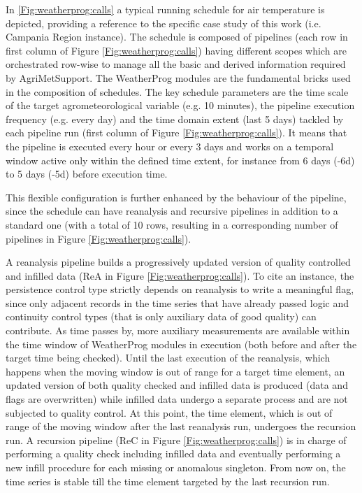 \documentclass[authoryear,preprint,review,12pt]{elsarticle}
\begin{document}
In \cref{Fig:weatherprog:calls} a typical running schedule for air temperature is depicted, providing a reference to the specific case study of this work (i.e. Campania Region instance).
The schedule is composed of pipelines (each row in first column of Figure \ref{Fig:weatherprog:calls}) having different scopes which are orchestrated row-wise to manage all the basic and derived information required by Agri\-Met\-Support.
The WeatherProg modules are the fundamental bricks used in the composition of schedules.
The key schedule parameters are the time scale of the target agrometeorological variable (e.g. 10 minutes), the pipeline execution frequency (e.g. every day) and the time domain extent (last 5 days) tackled by each pipeline run (first column of Figure \ref{Fig:weatherprog:calls}).
It means that the pipeline is executed every hour or every 3 days and works on a temporal window active only within the defined time extent, for instance from 6 days (-6d) to 5 days (-5d) before execution time.

This flexible configuration is further enhanced by the behaviour of the pipeline, since the schedule can have reanalysis and recursive pipelines in addition to a standard one (with a total of 10 rows, resulting in a corresponding number of pipelines in Figure \ref{Fig:weatherprog:calls}).

A reanalysis pipeline builds a progressively updated version of quality controlled and infilled data (ReA in Figure \ref{Fig:weatherprog:calls}).
To cite an instance, the persistence control type strictly depends on reanalysis to write a meaningful flag, since only adjacent records in the time series that have already passed logic and continuity control types (that is only auxiliary data of good quality) can contribute. %
As time passes by, more auxiliary measurements are available within the time window of WeatherProg modules in execution (both before and after the target time being checked). 
Until the last execution of the reanalysis, which happens when the moving window is out of range for a target time element, an updated version of both quality checked and infilled data is produced (data and flags are overwritten) while infilled data undergo a separate process and are not subjected to quality control.
At this point, the time element, which is out of range of the moving window after the last reanalysis run, undergoes the recursion run.
A recursion pipeline (ReC in Figure \ref{Fig:weatherprog:calls}) is in charge of performing a quality check including infilled data and eventually performing a new infill procedure for each missing or anomalous singleton.
From now on, the time series is stable till the time element targeted by the last recursion run.
\end{document}
